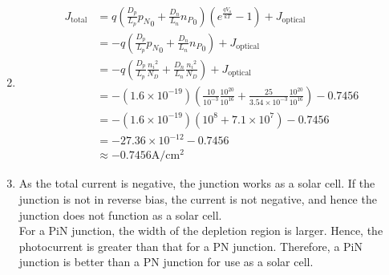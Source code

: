 \documentclass[fleqn, a4paper, 10pt, oneside]{amsart}
\theoremstyle{definition}
\theoremstyle{theorem}
\begin{document}
\begin{solution}
\begin{enumerate}[leftmargin=*]
\begin{align*}
			\end{align*}
		\item
			\begin{align*}
				J_{\text{total}} &= q \left( \frac{D_p}{L_p} {p_N}_0 +  \frac{D_n}{L_n} {n_P}_0 \right) \left( e^{\frac{q V_a}{k T}} - 1 \right) + J_{\text{optical}}\\
				&= -q \left( \frac{D_p}{L_p} {p_N}_0 +  \frac{D_n}{L_n} {n_P}_0 \right) + J_{\text{optical}}\\
				&= -q \left( \frac{D_p}{L_p} \frac{{n_i}^2}{N_D} +  \frac{D_n}{L_n} \frac{{n_i}^2}{N_D} \right) + J_{\text{optical}}\\
				&= -\left( 1.6 \times 10^{-19} \right) \left( \frac{10}{10^{-3}} \frac{10^{20}}{10^{16}} + \frac{25}{3.54 \times 10^{-3}} \frac{10^{20}}{10^{16}} \right) -0.7456\\
				&= -\left( 1.6 \times 10^{-19} \right) \left( 10^{8} + 7.1 \times 10^{7} \right) - 0.7456\\
				&= -27.36 \times 10^{-12} - 0.7456\\
				&\approx -0.7456 \si{\ampere\per\centi\metre\squared}
			\end{align*}
		\item
			As the total current is negative, the junction works as a solar cell.
			If the junction is not in reverse bias, the current is not negative, and hence the junction does not function as a solar cell.\\
			For a PiN junction, the width of the depletion region is larger.
			Hence, the photocurrent is greater than that for a PN junction.
			Therefore, a PiN junction is better than a PN junction for use as a solar cell.
	\end{enumerate}
\end{solution}
\end{document}
